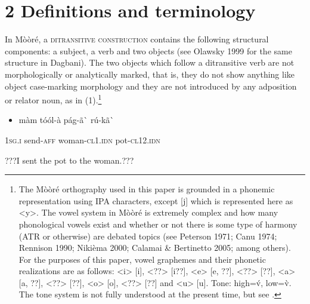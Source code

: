 \documentclass[output=paper]{langsci/langscibook}
\begin{document}
\chapter{2 Definitions and terminology}

In M\`{o}\`{o}r\'{e}, a \textsc{ditransitive construction} contains the following structural components: a subject, a verb and two objects (see Olawsky 1999 for the same structure in Dagbani). The two objects which follow a ditransitive verb are not morphologically or analytically marked, that is, they do not show anything like object case-marking morphology and they are not introduced by any adposition or relator noun, as in (1).\footnote{ {The M\`{o}\`{o}r\'{e} orthography used in this paper is grounded in a phonemic representation using IPA characters, except [j] which is represented here as {\textless}y{\textgreater}. The vowel system in M\`{o}\`{o}r\'{e} is extremely complex and how many phonological vowels exist and whether or not there is some type of harmony (ATR or otherwise) are debated topics (see Peterson 1971; Canu 1974; Rennison 1990; Niki\`{e}ma 2000; Calamai \& Bertinetto 2005; among others). For the purposes of this paper, vowel graphemes and their phonetic realizations are as follows: {\textless}i{\textgreater} [i], {\textless}??{\textgreater} [i??], {\textless}e{\textgreater} [e, ??], {\textless}??{\textgreater} [??], {\textless}a{\textgreater} [a, ??], {\textless}??{\textgreater} [??], {\textless}o{\textgreater} [o], {\textless}??{\textgreater} [??] and {\textless}u{\textgreater} [u]. Tone: high=\'{v}, low=\`{v}. The tone system is not fully understood at the present time, but see \citet{Peterson1971}.} }

\begin{itemize}
\item \begin{styleNumberedEX}
\label{bkm:Ref424141523}m\`{a}m    t\'{o}\'{o}l-\`{a}        p\'{a}g-\~{a}\`{ }             r\'{u}-k\~{a}\`{ }
\end{styleNumberedEX}\end{itemize}
\begin{styleGloss}
\textsc{1sg.i}    send-\textsc{aff}      woman-\textsc{cl1.idn}       pot-\textsc{cl12.idn}
\end{styleGloss}

\begin{styleTranslation}
???I sent the pot to the woman.???  
\end{styleTranslation}
\end{document}
